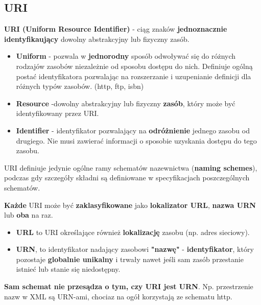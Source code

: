 \documentclass[../main.tex]{subfiles}
\begin{document}
    \subsection{URI}
    \textbf{URI (Uniform Resource Identifier)} - ciąg znaków \textbf{jednoznacznie identyfikaujący} dowolny abstrakcyjny lub fizyczny zasób.
    \begin{itemize}
        \item \textbf{Uniform} - pozwala w \textbf{jednorodny} sposób odwoływać się do różnych rodzajów zasobów niezależnie od sposobu dostępu do nich. Definiuje ogólną postać identyfikatora pozwalając na rozszerzanie i uzupenianie definicji dla różnych typów zasobów. (http, ftp, isbn)
        \item \textbf{Resource} -dowolny abstrakcyjny lub fizyczny \textbf{zasób}, który może być identyfikowany przez URI.
        \item \textbf{Identifier} - identyfikator pozwalający na \textbf{odróżnienie} jednego zasobu od drugiego. Nie musi zawierać informacji o sposobie uzyskania dostępu do tego zasobu.
    \end{itemize}
    URI definiuje jedynie ogólne ramy schematów nazewnictwa (\textbf{naming schemes}), podczas gdy szczegóły składni są
    definiowane w specyfikacjach poszczególnych schematów.

    \textbf{Każde} URI może być \textbf{zaklasyfikowane} jako \textbf{lokalizator URL}, \textbf{nazwa URN} lub
    \textbf{oba} na raz.

    \begin{itemize}
        \item \textbf{URL} to URI określające również \textbf{lokalizację} zasobu (np. adres sieciowy).
        \item \textbf{URN}, to identyfikator nadający zasobowi \textbf{"nazwę"} - \textbf{identyfikator}, który pozostaje \textbf{globalnie unikalny} i trwały nawet
        jeśli sam zasób przestanie istnieć lub stanie się niedostępny.
    \end{itemize}
    \textbf{Sam schemat nie przesądza o tym, czy URI jest URN}. Np. przestrzenie nazw w XML są URN-ami, chociaz na ogół
    korzystają ze schematu http.
\end{document}
